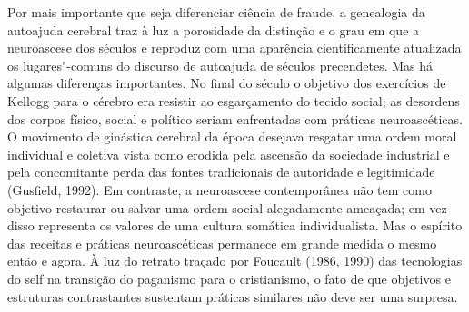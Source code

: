 Por mais importante que seja diferenciar ciência de fraude, a genealogia
da autoajuda cerebral traz à luz a porosidade da distinção e o grau em
que a neuroascese dos séculos  e  reproduz com uma aparência
cientificamente atualizada os lugares"-comuns do discurso de autoajuda de
séculos precendetes. Mas há algumas diferenças importantes. No final do
século  o objetivo dos exercícios de Kellogg para o cérebro era
resistir ao esgarçamento do tecido social; as desordens dos corpos
físico, social e político seriam enfrentadas com práticas
neuroascéticas. O movimento de ginástica cerebral da época desejava
resgatar uma ordem moral individual e coletiva vista como erodida pela
ascensão da sociedade industrial e pela concomitante perda das fontes
tradicionais de autoridade e legitimidade (Gusfield, 1992). Em
contraste, a neuroascese contemporânea não tem como objetivo restaurar
ou salvar uma ordem social alegadamente ameaçada; em vez disso
representa os valores de uma cultura somática individualista. Mas o
espírito das receitas e práticas neuroascéticas permanece em grande
medida o mesmo então e agora. À luz do retrato traçado por Foucault
(1986, 1990) das tecnologias do self na transição do paganismo para o
cristianismo, o fato de que objetivos e estruturas contrastantes
sustentam práticas similares não deve ser uma surpresa.

